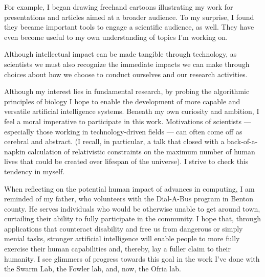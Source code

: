 For example, I began drawing freehand cartoons illustrating my work for presentations and articles aimed at a broader audience.
To my surprise, I found they became important tools to engage a scientific audience, as well.
They have even become useful to my own understanding of topics I'm working on.


Although intellectual impact can be made tangible through technology, as scientists we must also recognize the immediate impacts we can make through choices about how we choose to conduct ourselves and our research activities.

Although my interest lies in fundamental research, by probing the algorithmic principles of biology I hope to enable the development of more capable and versatile artificial intelligence systems.
Beneath my own curiosity and ambition, I feel a moral imperative to participate in this work.
Motivations of scientists --- especially those working in technology-driven fields --- can often come off as cerebral and abstract.
(I recall, in particular, a talk that closed with a back-of-a-napkin calculation of relativistic constraints on the maximum number of human lives that could be created over lifespan of the universe).
I strive to check this tendency in myself.

When reflecting on the potential human impact of advances in computing, I am reminded of my father, who volunteers with the Dial-A-Bus program in Benton county.
He serves individuals who would be otherwise unable to get around town, curtailing their ability to fully participate in the community.
I hope that, through applications that counteract disability and free us from dangerous or simply menial tasks, stronger artificial intelligence will enable people to more fully exercise their human capabilities and, thereby, lay a fuller claim to their humanity.
I see glimmers of progress towards this goal in the work I've done with the Swarm Lab, the Fowler lab, and, now, the Ofria lab.

